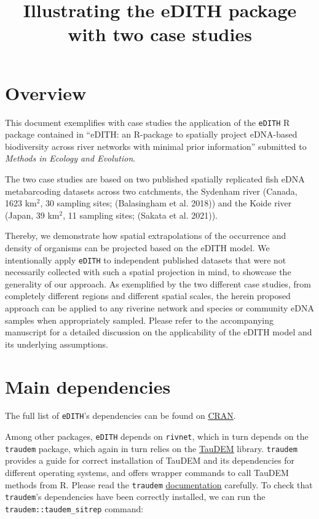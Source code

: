 \documentclass[
]{article}
\title{Illustrating the eDITH package with two case studies}
\author{}
\date{\vspace{-2.5em}}
\begin{document}
\maketitle

{
\setcounter{tocdepth}{2}
\tableofcontents
}
\hypertarget{overview}{%
\section{Overview}\label{overview}}

This document exemplifies with case studies the application of the \texttt{eDITH} R package contained in ``eDITH: an R-package to spatially project eDNA-based biodiversity across river networks with minimal prior information'' submitted to \emph{Methods in Ecology and Evolution}.

The two case studies are based on two published spatially replicated fish eDNA metabarcoding datasets across two catchments, the Sydenham river (Canada, 1623 km\(^2\), 30 sampling sites; (Balasingham et al. 2018)) and the Koide river (Japan, 39 km\(^2\), 11 sampling sites; (Sakata et al. 2021)).

Thereby, we demonstrate how spatial extrapolations of the occurrence and density of organisms can be projected based on the eDITH model. We intentionally apply \texttt{eDITH} to independent published datasets that were not necessarily collected with such a spatial projection in mind, to showcase the generality of our approach. As exemplified by the two different case studies, from completely different regions and different spatial scales, the herein proposed approach can be applied to any riverine network and species or community eDNA samples when appropriately sampled. Please refer to the accompanying manuscript for a detailed discussion on the applicability of the eDITH model and its underlying assumptions.

\hypertarget{main-dependencies}{%
\section{Main dependencies}\label{main-dependencies}}

The full list of \texttt{eDITH}'s dependencies can be found on \href{https://cran.r-project.org/web/packages/eDITH/index.html}{CRAN}.

Among other packages, \texttt{eDITH} depends on \texttt{rivnet}, which in turn depends on the \texttt{traudem} package, which again in turn relies on the \href{https://hydrology.usu.edu/taudem/taudem5/}{TauDEM} library. \texttt{traudem} provides a guide for correct installation of TauDEM and its dependencies for different operating systems, and offers wrapper commands to call TauDEM methods from R. Please read the \texttt{traudem} \href{https://lucarraro.github.io/traudem/}{documentation} carefully. To check that \texttt{traudem}'s dependencies have been correctly installed, we can run the \texttt{traudem::taudem\_sitrep} command:
\end{document}
